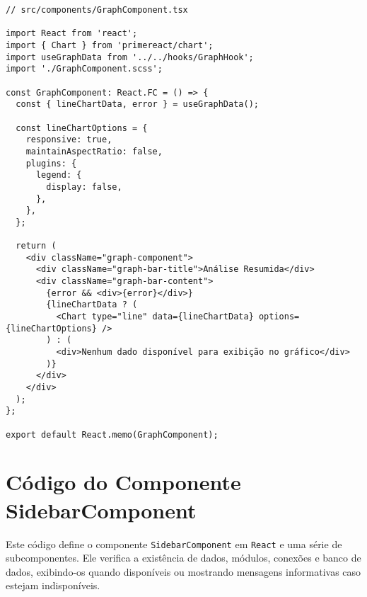 \begin{verbatim}
// src/components/GraphComponent.tsx

import React from 'react';
import { Chart } from 'primereact/chart';
import useGraphData from '../../hooks/GraphHook';
import './GraphComponent.scss';

const GraphComponent: React.FC = () => {
  const { lineChartData, error } = useGraphData();

  const lineChartOptions = {
    responsive: true,
    maintainAspectRatio: false,
    plugins: {
      legend: {
        display: false,
      },
    },
  };

  return (
    <div className="graph-component">
      <div className="graph-bar-title">Análise Resumida</div>
      <div className="graph-bar-content">
        {error && <div>{error}</div>}
        {lineChartData ? (
          <Chart type="line" data={lineChartData} options={lineChartOptions} />
        ) : (
          <div>Nenhum dado disponível para exibição no gráfico</div>
        )}
      </div>
    </div>
  );
};

export default React.memo(GraphComponent);
\end{verbatim}
\chapter{Código do Componente SidebarComponent}
\label{Anexo:CodigoSidebar}

Este código define o componente \texttt{SidebarComponent} em \texttt{React} e uma série de subcomponentes. Ele verifica a existência de dados, módulos, conexões e banco de dados, exibindo-os quando disponíveis ou mostrando mensagens informativas caso estejam indisponíveis.

